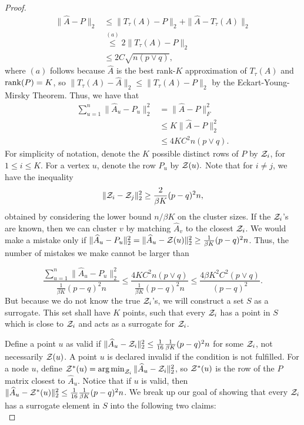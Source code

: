 \documentclass{article}
\begin{document}
\begin{proof}
\begin{align*}
\| \hat{A} - P \|_2 &\leq \| T_\tau(A)  - P \|_2 + \| \hat{A} - T_\tau(A) \|_2 \\
   &\stackrel{(a)}\leq 2\| T_\tau(A) - P \|_2 \\
  &\leq 2C \sqrt{ n (p \vee q)}, 
\end{align*}
where $(a)$ follows because $\hat{A}$ is the best rank-$K$ approximation of $T_\tau (A)$ and $\rank(P) = K$, so $\|T_\tau(A) - \hat{A}\|_2 \le \|T_\tau(A) - P\|_2$ by the Eckart-Young-Mirsky Theorem. Thus, we have that
\begin{align*}
\sum_{u=1}^n \| \hat{A}_u - P_u \|_2^2 &= \| \hat{A} - P \|_F^2\\
&\leq K\| \hat A - P \|_2^2\\
&\leq 4 K C^2 n (p \vee q).
\end{align*}
For simplicity of notation, denote the $K$ possible distinct rows of $P$ by ${\cal Z}_i$, for $1 \leq i \leq K$. For a vertex $u$, denote the row $P_u$ by ${\cal Z}(u).$ Note that for $i \neq j$, we have the inequality
\[
\| {\cal Z}_i - {\cal Z}_j \|_2^2 \geq \frac{2}{\beta K} (p - q)^2 n,
\]
obtained by considering the lower bound $n/\beta K$ on the cluster sizes. If the ${\cal Z}_i$'s are known, then we can cluster $v$ by matching $\hat{A}_v$ to the closest ${\cal Z}_i$. We would make a mistake only if $\| \hat{A}_u - P_u \|_2^2 = \| \hat{A}_u - {\cal Z}(u) \|_2^2 \geq \frac{1}{\beta K} (p-q)^2 n$. Thus, the number of mistakes we make cannot be larger than

\[
\frac{\sum_{u=1}^n \| \hat{A}_u - P_u \|_2^2}{ \frac{1}{\beta K} (p-q)^2 n } \leq \frac{ 4 K C^2 n (p \vee q)}{ \frac{1}{\beta K} (p-q)^2 n} \leq \frac{4 \beta K^2 C^2 (p \vee q)}{(p-q)^2}. 
\]
But because we do not know the true ${\cal Z}_i$'s, we will construct a set $S$ as a surrogate. This set shall have $K$ points, such that every ${\cal Z}_i$ has a point in $S$ which is close to ${\cal Z}_i$ and acts as a surrogate for ${\cal Z}_i$.

Define a point $u$ as valid if $\| \hat{A}_u - {\cal Z}_i \|_2^2 \leq \frac{1}{16} \frac{1}{\beta K} (p-q)^2 n$ for some ${\cal Z}_i$, not necessarily ${\cal Z}(u)$. A point $u$ is declared invalid if the condition is not fulfilled. For a node $u$, define ${\cal Z}^*(u) = \argmin_{{\cal Z}_i} \| \hat{A}_u - {\cal Z}_i \|_2^2$, so ${\cal Z}^*(u)$ is the row of the $P$ matrix closest to $\hat{A}_u$. Notice that if $u$ is valid, then $\| \hat{A}_u - {\cal Z}^*(u) \|_2^2 \leq \frac{1}{16} \frac{1}{\beta K} (p - q)^2 n$. We break up our goal of showing that every ${\cal Z}_i$ has a surrogate element in $S$ into the following two claims:\\


\end{proof}
\end{document}
